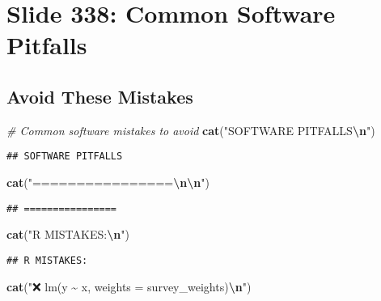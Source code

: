 \documentclass[
]{article}
\newenvironment{Shaded}{\begin{snugshade}}{\end{snugshade}}
\newcommand{\CommentTok}[1]{\textcolor[rgb]{0.56,0.35,0.01}{\textit{#1}}}
\newcommand{\FunctionTok}[1]{\textcolor[rgb]{0.13,0.29,0.53}{\textbf{#1}}}
\newcommand{\NormalTok}[1]{#1}
\newcommand{\SpecialCharTok}[1]{\textcolor[rgb]{0.81,0.36,0.00}{\textbf{#1}}}
\newcommand{\StringTok}[1]{\textcolor[rgb]{0.31,0.60,0.02}{#1}}
\begin{document}
\section{Slide 338: Common Software
Pitfalls}\label{slide-338-common-software-pitfalls}

\subsection{Avoid These Mistakes}\label{avoid-these-mistakes}

\begin{Shaded}
\begin{Highlighting}[]
\CommentTok{\# Common software mistakes to avoid}
\FunctionTok{cat}\NormalTok{(}\StringTok{"SOFTWARE PITFALLS}\SpecialCharTok{\textbackslash{}n}\StringTok{"}\NormalTok{)}
\end{Highlighting}
\end{Shaded}

\begin{verbatim}
## SOFTWARE PITFALLS
\end{verbatim}

\begin{Shaded}
\begin{Highlighting}[]
\FunctionTok{cat}\NormalTok{(}\StringTok{"================}\SpecialCharTok{\textbackslash{}n\textbackslash{}n}\StringTok{"}\NormalTok{)}
\end{Highlighting}
\end{Shaded}

\begin{verbatim}
## ================
\end{verbatim}

\begin{Shaded}
\begin{Highlighting}[]
\FunctionTok{cat}\NormalTok{(}\StringTok{"R MISTAKES:}\SpecialCharTok{\textbackslash{}n}\StringTok{"}\NormalTok{)}
\end{Highlighting}
\end{Shaded}

\begin{verbatim}
## R MISTAKES:
\end{verbatim}

\begin{Shaded}
\begin{Highlighting}[]
\FunctionTok{cat}\NormalTok{(}\StringTok{"❌ lm(y \textasciitilde{} x, weights = survey\_weights)}\SpecialCharTok{\textbackslash{}n}\StringTok{"}\NormalTok{)}
\end{Highlighting}
\end{Shaded}
\end{document}
